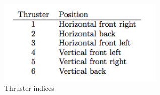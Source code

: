 	\begin{figure}[!ht]
	\begin{center}
		\includegraphics[width=80mm]{./images/mechanics/matrixindex.png}
		\caption{Thruster indices}
		\label{matrixindex}
	\end{center}
	\end{figure}

	
	
 